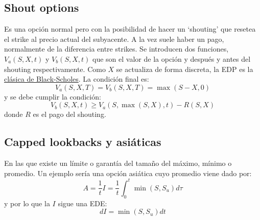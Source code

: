 \subsection{Shout options}
Es una opción normal pero con la posibilidad de hacer un `shouting' que resetea el strike al precio actual del subyacente. A la vez suele haber un pago, normalmente de la diferencia entre strikes. Se introducen dos funciones, $V_a(S,X,t)$ y $V_b(S,X,t)$ que son el valor de la opción y después y antes del shouting respectivamente. Como $X$ se actualiza de forma discreta, la EDP es la \underline{clásica de Black-Scholes}. La condición final es:
\begin{equation*}
    \boxed{V_a(S, X, T) = V_b(S, X, T) = \max(S - X, 0)}
\end{equation*}
y se debe cumplir la condición:
\begin{equation*}
    \boxed{V_b(S, X, t) \geq V_a(S, \max(S, X), t) - R(S, X)}
\end{equation*}
donde $R$ es el pago del shouting. 



\subsection{Capped lookbacks y asiáticas}
En las que existe un límite o garantía del tamaño del máximo, mínimo o promedio. Un ejemplo sería una opción asiática cuyo promedio viene dado por:
\begin{equation*}
    A = \frac{1}{t} I = \frac{1}{t} \int_0^t \min(S, S_u) d\tau
\end{equation*}
y por lo que la $I$ sigue una EDE:\@
\begin{equation*}
    dI = \min(S, S_u) dt
\end{equation*}





